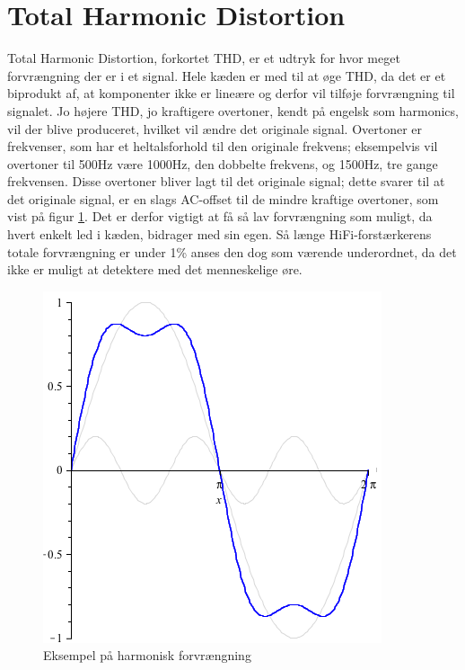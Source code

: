 \section{Total Harmonic Distortion}
\label{thd}
Total Harmonic Distortion, forkortet THD, er et udtryk for hvor meget forvrængning der er i et signal.  Hele kæden er med til at øge THD, da det er et biprodukt af, at komponenter ikke er lineære og derfor vil tilføje forvrængning til signalet. Jo højere THD, jo kraftigere overtoner, kendt på engelsk som harmonics, vil der blive produceret, hvilket vil ændre det originale signal. Overtoner er frekvenser, som har et heltalsforhold til den originale frekvens; eksempelvis vil overtoner til 500Hz være 1000Hz, den dobbelte frekvens, og 1500Hz, tre gange frekvensen. Disse overtoner bliver lagt til det originale signal; dette svarer til at det originale signal, er en slags AC-offset til de mindre kraftige overtoner, som vist på figur \ref{fig:harmonic_distortion}. Det er derfor vigtigt at få så lav forvrængning som muligt, da hvert enkelt led i kæden, bidrager med sin egen. Så længe HiFi-forstærkerens totale forvrængning er under 1\% anses den dog som værende underordnet, da det ikke er muligt at detektere med det menneskelige øre.

\begin{figure}[h]
\centering
\includegraphics[scale=.4]{valg_af_loesning/thd/thdsamlet.png}
\caption{Eksempel på harmonisk forvrængning}
\label{fig:harmonic_distortion}
\end{figure}
